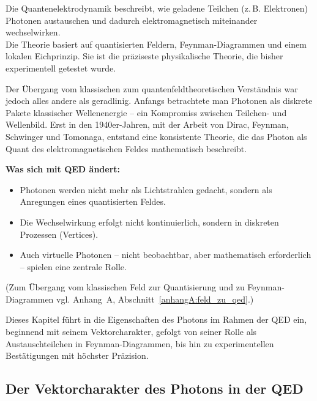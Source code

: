 \medskip
\begin{tcolorbox}[physikbox, title=Was ist Quantenelektrodynamik?]
	\label{box:was ist quantenelektro}
	\small
	Die Quantenelektrodynamik beschreibt, wie geladene Teilchen (z.\,B. Elektronen) Photonen austauschen und dadurch elektromagnetisch miteinander wechselwirken.\\
	Die Theorie basiert auf quantisierten Feldern, Feynman-Diagrammen und einem lokalen Eichprinzip. Sie ist die präziseste physikalische Theorie, die bisher experimentell getestet wurde.
\end{tcolorbox}
\medskip
Der Übergang vom klassischen zum quantenfeldtheoretischen Verständnis war jedoch alles andere als geradlinig. Anfangs betrachtete man Photonen als diskrete Pakete klassischer Wellenenergie – ein Kompromiss zwischen Teilchen- und Wellenbild.
Erst in den 1940er-Jahren, mit der Arbeit von Dirac, Feynman, Schwinger und Tomonaga, entstand eine konsistente Theorie, die das Photon als Quant des elektromagnetischen Feldes mathematisch beschreibt.

\textbf{Was sich mit QED ändert:}
\begin{itemize}
	\item Photonen werden nicht mehr als Lichtstrahlen gedacht, sondern als Anregungen eines quantisierten Feldes.
	\item Die Wechselwirkung erfolgt nicht kontinuierlich, sondern in diskreten Prozessen (Vertices).
	\item Auch virtuelle Photonen – nicht beobachtbar, aber mathematisch erforderlich – spielen eine zentrale Rolle.
\end{itemize}
(Zum Übergang vom klassischen Feld zur Quantisierung und zu Feynman-Diagrammen vgl. Anhang~A, Abschnitt~\ref{anhangA:feld_zu_qed}.)

Dieses Kapitel führt in die Eigenschaften des Photons im Rahmen der QED ein, beginnend mit seinem Vektorcharakter, gefolgt von seiner Rolle als Austauschteilchen in Feynman-Diagrammen, bis hin zu experimentellen Bestätigungen mit höchster Präzision.

\subsection{Der Vektorcharakter des Photons in der QED}

